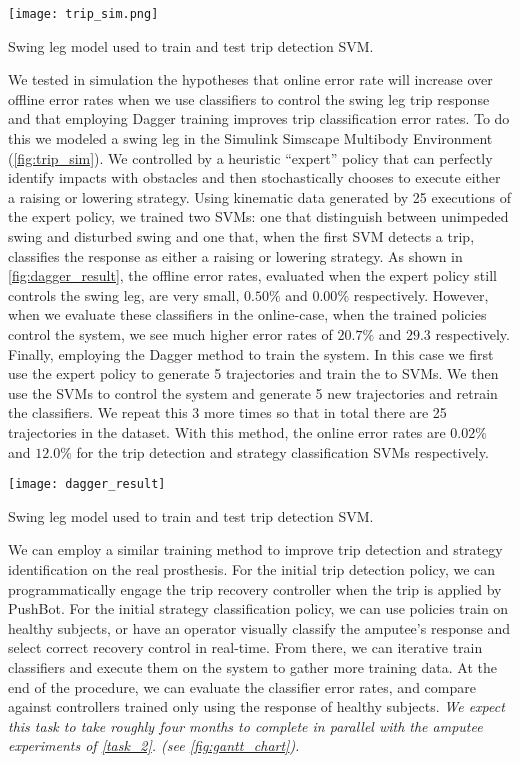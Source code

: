 \begin{marginfigure}
    \centering
    \texttt{[image: trip\_sim.png]}
    \caption{Swing leg model used to train and test trip detection
    SVM.}\label{fig:trip_sim}
\end{marginfigure}
We tested in simulation the hypotheses that online error rate will increase over
offline error rates when we use classifiers to control the swing leg trip
response and that employing Dagger training improves trip classification error
rates. To do this we modeled a swing leg in the Simulink Simscape Multibody
Environment (\cref{fig:trip_sim}). We controlled by a heuristic ``expert''
policy that can perfectly identify impacts with obstacles and then
stochastically chooses to execute either a raising or lowering strategy. Using
kinematic data generated by 25 executions of the expert policy, we trained two
SVMs: one that distinguish between unimpeded swing and disturbed swing and one
that, when the first SVM detects a trip, classifies the response as either a
raising or lowering strategy. As shown in \cref{fig:dagger_result}, the offline
error rates, evaluated when the expert policy still controls the swing leg, are
very small, $0.50\%$ and $0.00\%$ respectively. However, when we evaluate these
classifiers in the online-case, when the trained policies control the system, we
see much higher error rates of $20.7\%$ and $29.3$ respectively. Finally,
employing the Dagger method to train the system. In this case we first use the
expert policy to generate 5 trajectories and train the to SVMs. We then use the
SVMs to control the system and generate 5 new trajectories and retrain the
classifiers.  We repeat this 3 more times so that in total there are 25
trajectories in the dataset. With this method, the online error rates are
$0.02\%$ and $12.0\%$ for the trip detection and strategy classification SVMs
respectively. 
\begin{marginfigure}[-1in]
    \centering
    \texttt{[image: dagger\_result]}
    \caption{Swing leg model used to train and test trip detection
    SVM.}\label{fig:dagger_result}
\end{marginfigure}

We can employ a similar training method to improve trip detection and strategy
identification on the real prosthesis. For the initial trip detection policy, we
can programmatically engage the trip recovery controller when the trip is
applied by PushBot. For the initial strategy classification policy, we can use
policies train on healthy subjects, or have an operator visually classify the
amputee's response and select correct recovery control in real-time. From there,
we can iterative train classifiers and execute them on the system to gather more
training data. At the end of the procedure, we can evaluate the classifier error
rates, and compare against controllers trained only using the response of
healthy subjects. \emph{We expect this task to take roughly four months to
complete in parallel with the amputee experiments of \cref{task_2}.
(see \cref{fig:gantt_chart}).}


